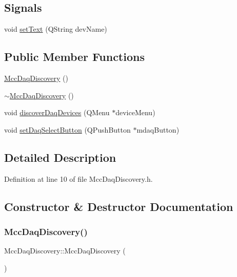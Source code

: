\subsection*{Signals}
\begin{DoxyCompactItemize}
\item 
void \hyperlink{class_mcc_daq_discovery_a5e82ed7ce9292c4f2b7cdc13dd09eb9c}{set\+Text} (Q\+String dev\+Name)
\end{DoxyCompactItemize}
\subsection*{Public Member Functions}
\begin{DoxyCompactItemize}
\item 
\hyperlink{class_mcc_daq_discovery_afe47943c3b455e83d934969dde13142e}{Mcc\+Daq\+Discovery} ()
\item 
\hyperlink{class_mcc_daq_discovery_a4e78c3976aa703110af281b229e4762a}{$\sim$\+Mcc\+Daq\+Discovery} ()
\item 
void \hyperlink{class_mcc_daq_discovery_a9b2541fefb5156e2412f4e3eb34eed72}{discover\+Daq\+Devices} (Q\+Menu $\ast$device\+Menu)
\item 
void \hyperlink{class_mcc_daq_discovery_aca6d5d7d2f0367de427d43b3947ea9df}{set\+Daq\+Select\+Button} (Q\+Push\+Button $\ast$mdaq\+Button)
\end{DoxyCompactItemize}


\subsection{Detailed Description}


Definition at line 10 of file Mcc\+Daq\+Discovery.\+h.



\subsection{Constructor \& Destructor Documentation}
\mbox{\label{class_mcc_daq_discovery_afe47943c3b455e83d934969dde13142e}} 
\subsubsection{\texorpdfstring{Mcc\+Daq\+Discovery()}{MccDaqDiscovery()}}
{\footnotesize\ttfamily Mcc\+Daq\+Discovery\+::\+Mcc\+Daq\+Discovery (\begin{DoxyParamCaption}{ }\end{DoxyParamCaption})}



